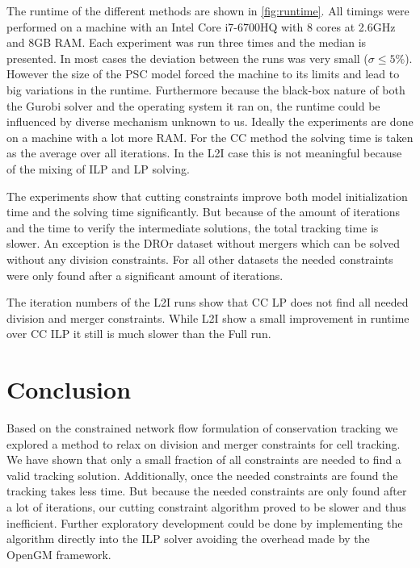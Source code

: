 \documentclass[10pt,twocolumn,letterpaper]{article}
\begin{document}
    The runtime of the different methods are shown in \cref{fig:runtime}. All timings were performed on a machine with an Intel Core i7-6700HQ with 8 cores at 2.6GHz and 8GB RAM. Each experiment was run three times and the median is presented. In most cases the deviation between the runs was very small ($\sigma \leq 5\%$). However the size of the PSC model forced the machine to its limits and lead to big variations in the runtime. Furthermore because the black-box nature of both the Gurobi solver and the operating system it ran on, the runtime could be influenced by diverse mechanism unknown to us. Ideally the experiments are done on a machine with a lot more RAM. For the CC method the solving time is taken as the average over all iterations. In the L2I case this is not meaningful because of the mixing of ILP and LP solving.

The experiments show that cutting constraints improve both model initialization time and the solving time significantly. But because of the amount of iterations and the time to verify the intermediate solutions, the total tracking time is slower. An exception is the DROr dataset without mergers which can be solved without any division constraints. For all other datasets the needed constraints were only found after a significant amount of iterations.

The iteration numbers of the L2I runs show that CC LP does not find all needed division and merger constraints. While L2I show a small improvement in runtime over CC ILP it still is much slower than the Full run.

\section{Conclusion}

Based on the constrained network flow formulation of conservation tracking we explored a method to relax on division and merger constraints for cell tracking. We have shown that only a small fraction of all constraints are needed to find a valid tracking solution. Additionally, once the needed constraints are found the tracking takes less time. But because the needed constraints are only found after a lot of iterations, our cutting constraint algorithm proved to be slower and thus inefficient. Further exploratory development could be done by implementing the algorithm directly into the ILP solver avoiding the overhead made by the OpenGM framework.


{\small


}
\end{document}
